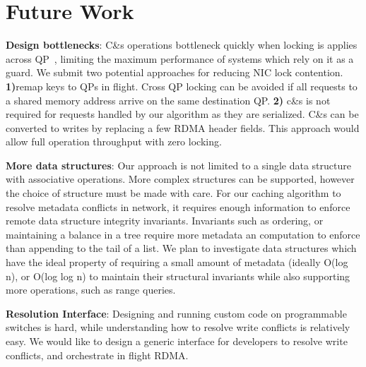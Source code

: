 \section{Future Work}

\textbf{Design bottlenecks}: 
C\&s operations bottleneck quickly when locking is applies across
QP~\cite{design-guidelines}, limiting the maximum performance of
systems which rely on it as a guard.  We submit two potential
approaches for reducing NIC lock contention.  \textbf{1)}remap keys to
QPs in flight. Cross QP locking can be avoided if all requests to a
shared memory address arrive on the same destination QP. \textbf{2)}
c\&s is not required for requests handled by our algorithm as they are
serialized. C\&s can be converted to writes by replacing a few RDMA
header fields. This approach would allow full operation throughput with
zero locking.

\textbf{More data structures}:
Our approach is not limited to a single
data structure with associative operations. More complex structures
can be supported, however the choice of structure must be made with
care.  For our caching algorithm to resolve metadata conflicts in
network, it requires enough information to enforce remote data
structure integrity invariants. Invariants such as ordering, or
maintaining a balance in a tree require more metadata an computation to
enforce than appending to the tail of a list. We plan to investigate
data structures which have the ideal property of requiring a small
amount of metadata (ideally O(log n), or O(log log n) to maintain
their structural invariants while also supporting more operations, such
as range queries.

\textbf{Resolution Interface}:
Designing and running custom code on
programmable switches is hard, while understanding how to resolve
write conflicts is relatively easy. We would like to design a generic
interface for developers to resolve write conflicts, and orchestrate
in flight RDMA.
